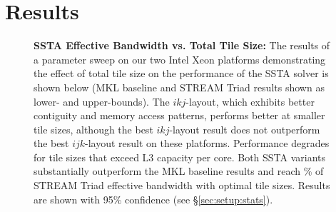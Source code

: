 \documentclass[10pt, conference, compsocconf]{IEEEtran}
\newcommand{\textapprox}{\texttildelow}
\begin{document}
\section{Results}
\label{sec:results}

\begin{figure}[!bth]
  \centering
  \caption{\small
    \textbf{SSTA Effective Bandwidth vs. Total Tile Size:}
    The results of a parameter sweep on our two Intel Xeon platforms
      demonstrating the effect of total tile size on the performance of the
      SSTA solver is shown below (MKL baseline and STREAM Triad results shown as
      lower- and upper-bounds).
    The \(ikj\)-layout, which exhibits better contiguity and memory access
      patterns, performs better at smaller tile sizes, although the best
      \(ikj\)-layout result does not outperform the best \(ijk\)-layout result
      on these platforms.
    Performance degrades for tile sizes that exceed L3 capacity per core.
    Both SSTA variants substantially outperform the MKL baseline results and 
      reach \textapprox 90\% of STREAM Triad effective bandwidth with optimal 
      tile sizes.
    Results are shown with 95\% confidence (see \S\ref{sec:setup:stats}).
  }
  \label{fig:results:bw_vs_tile_size_xeon}
  \begin{minipage}{0.49\textwidth}
  \end{minipage}
  \begin{minipage}{0.49\textwidth}
  \end{minipage}
\end{figure}
\end{document}
